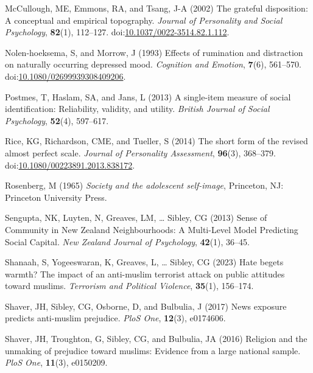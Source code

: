 \documentclass[
  single column]{article}
\newlength{\cslhangindent}
\newenvironment{CSLReferences}[2] %
 {\begin{list}{}{%
  \setlength{\itemindent}{0pt}
  \setlength{\leftmargin}{0pt}
  \setlength{\parsep}{0pt}
  \ifodd #1
   \setlength{\leftmargin}{\cslhangindent}
   \setlength{\itemindent}{-1\cslhangindent}
  \fi
  \setlength{\itemsep}{#2\baselineskip}}}
 {\end{list}}
\begin{document}
\begin{CSLReferences}{1}{0}
McCullough, ME, Emmons, RA, and Tsang, J-A (2002) The grateful
disposition: A conceptual and empirical topography. \emph{Journal of
Personality and Social Psychology}, \textbf{82}(1), 112--127.
doi:\href{https://doi.org/10.1037/0022-3514.82.1.112}{10.1037/0022-3514.82.1.112}.

Nolen-hoeksema, S, and Morrow, J (1993) Effects of rumination and
distraction on naturally occurring depressed mood. \emph{Cognition and
Emotion}, \textbf{7}(6), 561--570.
doi:\href{https://doi.org/10.1080/02699939308409206}{10.1080/02699939308409206}.

Postmes, T, Haslam, SA, and Jans, L (2013) A single-item measure of
social identification: Reliability, validity, and utility. \emph{British
Journal of Social Psychology}, \textbf{52}(4), 597--617.

Rice, KG, Richardson, CME, and Tueller, S (2014) The short form of the
revised almost perfect scale. \emph{Journal of Personality Assessment},
\textbf{96}(3), 368--379.
doi:\href{https://doi.org/10.1080/00223891.2013.838172}{10.1080/00223891.2013.838172}.

Rosenberg, M (1965) \emph{Society and the adolescent self-image},
Princeton, NJ: Princeton University Press.

Sengupta, NK, Luyten, N, Greaves, LM, \ldots{} Sibley, CG (2013) Sense
of Community in {N}ew {Z}ealand Neighbourhoods: A Multi-Level Model
Predicting Social Capital. \emph{New Zealand Journal of Psychology},
\textbf{42}(1), 36--45.

Shanaah, S, Yogeeswaran, K, Greaves, L, \ldots{} Sibley, CG (2023) Hate
begets warmth? The impact of an anti-muslim terrorist attack on public
attitudes toward muslims. \emph{Terrorism and Political Violence},
\textbf{35}(1), 156--174.

Shaver, JH, Sibley, CG, Osborne, D, and Bulbulia, J (2017) News exposure
predicts anti-muslim prejudice. \emph{PloS One}, \textbf{12}(3),
e0174606.

Shaver, JH, Troughton, G, Sibley, CG, and Bulbulia, JA (2016) Religion
and the unmaking of prejudice toward muslims: Evidence from a large
national sample. \emph{PloS One}, \textbf{11}(3), e0150209.


\end{CSLReferences}
\end{document}
